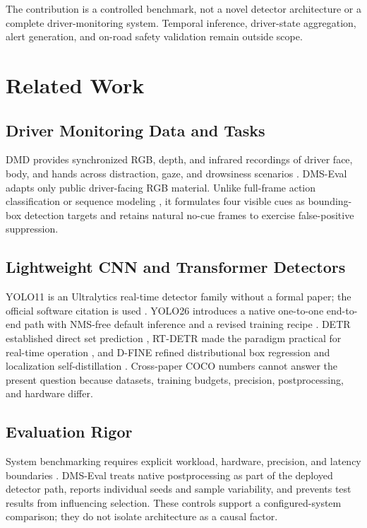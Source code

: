 \documentclass[conference]{IEEEtran}
\begin{document}
The contribution is a controlled benchmark, not a novel detector architecture or a complete driver-monitoring system. Temporal inference, driver-state aggregation, alert generation, and on-road safety validation remain outside scope.

\section{Related Work}
\subsection{Driver Monitoring Data and Tasks}
DMD provides synchronized RGB, depth, and infrared recordings of driver face, body, and hands across distraction, gaze, and drowsiness scenarios \cite{ortega2020dmd}. DMS-Eval adapts only public driver-facing RGB material. Unlike full-frame action classification \cite{eraqi2019driver,koay2021benchmark} or sequence modeling \cite{martin2019driveact,ghoddoosian2019rldd}, it formulates four visible cues as bounding-box detection targets and retains natural no-cue frames to exercise false-positive suppression.

\subsection{Lightweight CNN and Transformer Detectors}
YOLO11 is an Ultralytics real-time detector family without a formal paper; the official software citation is used \cite{yolo11_ultralytics}. YOLO26 introduces a native one-to-one end-to-end path with NMS-free default inference and a revised training recipe \cite{jocher2026yolo26}. DETR established direct set prediction \cite{carion2020detr}, RT-DETR made the paradigm practical for real-time operation \cite{zhao2024rtdetr}, and D-FINE refined distributional box regression and localization self-distillation \cite{peng2025dfine}. Cross-paper COCO numbers cannot answer the present question because datasets, training budgets, precision, postprocessing, and hardware differ.

\subsection{Evaluation Rigor}
System benchmarking requires explicit workload, hardware, precision, and latency boundaries \cite{reddi2020mlperf}. DMS-Eval treats native postprocessing as part of the deployed detector path, reports individual seeds and sample variability, and prevents test results from influencing selection. These controls support a configured-system comparison; they do not isolate architecture as a causal factor.
\end{document}
